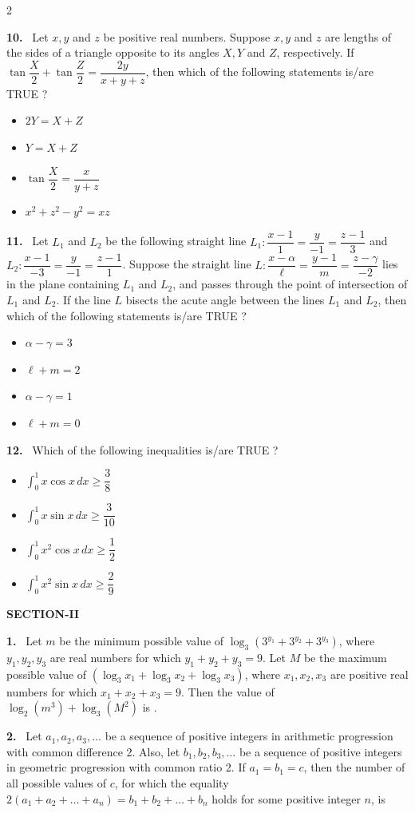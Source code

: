 \documentclass[10pt]{extarticle}
\newcommand{\sect}[1]{\par\smallskip\noindent\textbf{#1}\par}
\newcommand{\qn}[1]{\par\smallskip\noindent\textbf{#1.}~}
\newenvironment{qoptions}{\begin{itemize}[leftmargin=1.8em,itemsep=1pt,topsep=2pt,label={}]}{\end{itemize}}
\newcommand{\opt}[2]{\item[(#1)] #2}
\begin{document}
\begin{multicols}{2}
\qn{10} Let $x,y$ and $z$ be positive real numbers. Suppose $x,y$ and $z$ are lengths of the sides of a triangle opposite to its angles $X,Y$ and $Z$, respectively. If $\tan\dfrac X2+\tan\dfrac Z2=\dfrac{2y}{x+y+z}$, then which of the following statements is/are TRUE ?
\begin{qoptions}
\opt{A}{$2Y=X+Z$}
\opt{B}{$Y=X+Z$}
\opt{C}{$\tan\dfrac X2=\dfrac x{y+z}$}
\opt{D}{$x^2+z^2-y^2=xz$}
\end{qoptions}

\qn{11} Let $L_1$ and $L_2$ be the following straight line $L_1:\dfrac{x-1}1=\dfrac y{-1}=\dfrac{z-1}3$ and $L_2:\dfrac{x-1}{-3}=\dfrac y{-1}=\dfrac{z-1}1$. Suppose the straight line $L:\dfrac{x-\alpha}\ell=\dfrac{y-1}m=\dfrac{z-\gamma}{-2}$ lies in the plane containing $L_1$ and $L_2$, and passes through the point of intersection of $L_1$ and $L_2$. If the line $L$ bisects the acute angle between the lines $L_1$ and $L_2$, then which of the following statements is/are TRUE ?
\begin{qoptions}
\opt{A}{$\alpha-\gamma=3$}
\opt{B}{$\ell+m=2$}
\opt{C}{$\alpha-\gamma=1$}
\opt{D}{$\ell+m=0$}
\end{qoptions}

\qn{12} Which of the following inequalities is/are TRUE ?
\begin{qoptions}
\opt{A}{$\displaystyle\int_0^1x\cos x\,dx\ge\dfrac38$}
\opt{B}{$\displaystyle\int_0^1x\sin x\,dx\ge\dfrac3{10}$}
\opt{C}{$\displaystyle\int_0^1x^2\cos x\,dx\ge\dfrac12$}
\opt{D}{$\displaystyle\int_0^1x^2\sin x\,dx\ge\dfrac29$}
\end{qoptions}

\sect{SECTION-II}
\qn{1} Let $m$ be the minimum possible value of $\log_3\left(3^{y_1}+3^{y_2}+3^{y_3}\right)$, where $y_1,y_2,y_3$ are real numbers for which $y_1+y_2+y_3=9$. Let $M$ be the maximum possible value of $(\log_3x_1+\log_3x_2+\log_3x_3)$, where $x_1,x_2,x_3$ are positive real numbers for which $x_1+x_2+x_3=9$. Then the value of $\log_2(m^3)+\log_3(M^2)$ is \underline{\hspace{1.2cm}}.

\qn{2} Let $a_1,a_2,a_3,\ldots$ be a sequence of positive integers in arithmetic progression with common difference 2. Also, let $b_1,b_2,b_3,\ldots$ be a sequence of positive integers in geometric progression with common ratio 2. If $a_1=b_1=c$, then the number of all possible values of $c$, for which the equality $2(a_1+a_2+\ldots+a_n)=b_1+b_2+\ldots+b_n$ holds for some positive integer $n$, is \underline{\hspace{1.2cm}}


\end{multicols}
\end{document}
